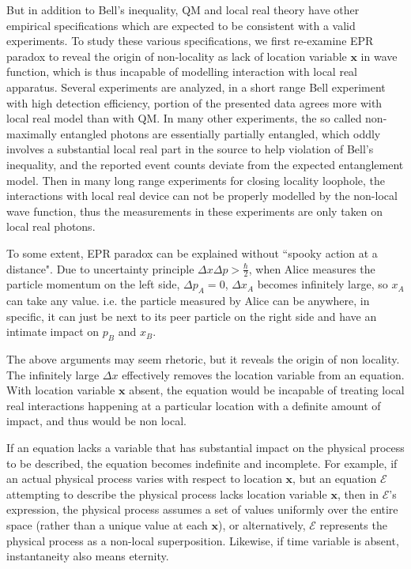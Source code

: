 \documentclass[prd,showpacs,twocolumn]{revtex4-1}
\begin{document}
But in addition to Bell's inequality, QM and local real theory have other empirical specifications which are expected to be consistent with a valid experiments. To study these various specifications, we first re-examine EPR paradox\cite{EPR} to reveal the origin of non-locality as lack of location variable $\mathbf x$ in wave function, which is thus incapable of modelling interaction with local real apparatus. Several experiments are analyzed, in a short range Bell experiment with high detection efficiency, portion of the presented data agrees more with local real model than with QM. In many other experiments, the so called non-maximally entangled photons are essentially partially entangled, which oddly involves a substantial local real part in the source to help violation of Bell's inequality, and the reported event counts deviate from the expected entanglement model. Then in many long range experiments for closing locality loophole, the interactions with local real device can not be properly modelled by the non-local wave function, thus the measurements in these experiments are only taken on local real photons.

To some extent, EPR paradox can be explained without ``spooky action at a distance". Due to uncertainty principle $\Delta x\Delta p > \frac{\hbar}{2}$, when Alice measures the particle momentum on the left side, $\Delta p_A=0$, $\Delta x_A$ becomes infinitely large, so $x_A$ can take any value. i.e. the particle measured by Alice can be anywhere, in specific, it can just be next to its peer particle on the right side and have an intimate impact on $p_B$ and $x_B$.

The above arguments may seem rhetoric, but it reveals the origin of non locality. The infinitely large $\Delta x$ effectively removes the location variable from an equation. With location variable $\mathbf x$ absent, the equation would be incapable of treating local real interactions happening at a particular location with a definite amount of impact, and thus would be non local.

If an equation lacks a variable that has substantial impact on the physical process to be described, the equation becomes indefinite and incomplete. For example, if an actual physical process varies with respect to location $\mathbf x$, but an equation $\mathcal E$ attempting to describe the physical process lacks location variable $\mathbf x$, then in $\mathcal E$'s expression, the physical process assumes a set of values uniformly over the entire space (rather than a unique value at each $\mathbf x$), or alternatively, $\mathcal E$ represents the physical process as a non-local superposition. Likewise, if time variable is absent, instantaneity also means eternity.
\end{document}
